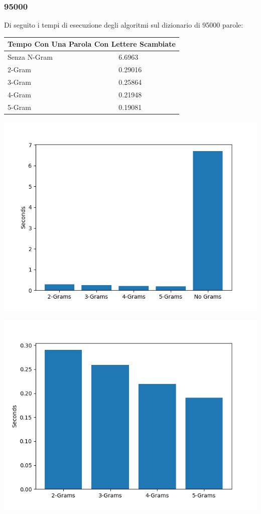 \documentclass{article}
\begin{document}
\subsubsection{95000}
Di seguito i tempi di esecuzione degli algoritmi sul dizionario di 95000 parole:
\medskip

\begin{tabular}{ |p{3cm}||p{3.5cm}|  }
 \hline
 \multicolumn{2}{|c|}{Tempo Con Una Parola Con Lettere Scambiate} \\
\hline
 Senza N-Gram  &   6.6963\\\hline
 2-Gram &  0.29016   \\\hline
 3-Gram & 0.25864 \\\hline
 4-Gram & 0.21948\\\hline
 5-Gram & 0.19081  \\
 \hline
\end{tabular}

\includegraphics[scale=0.5]{img/LetteraScambiata_95000_parole.png}

\includegraphics[scale=0.5]{img/LetteraScambiataSoloGram_95000_parole.png}
\end{document}
